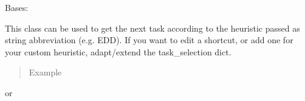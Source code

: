 \documentclass[letterpaper,10pt,english]{sphinxmanual}
\begin{document}
\begin{fulllineitems}
\label{\detokenize{agents.heuristic:agents.heuristic.heuristic_agent.HeuristicSelectionAgent}}
\sphinxAtStartPar
Bases: 

\sphinxAtStartPar
This class can be used to get the next task according to the heuristic passed as string abbreviation (e.g. EDD).
If you want to edit a shortcut, or add one for your custom heuristic, adapt/extend the task\_selection dict.
\begin{quote}\begin{description}
\item[{Example}] \leavevmode
\end{description}\end{quote}

\begin{sphinxVerbatim}[commandchars=\\\{\}]
 
     
\end{sphinxVerbatim}

\sphinxAtStartPar
or

\begin{sphinxVerbatim}[commandchars=\\\{\}]
  
     
     
\end{sphinxVerbatim}

\begin{fulllineitems}
\label{\detokenize{agents.heuristic:agents.heuristic.heuristic_agent.HeuristicSelectionAgent.__init__}}
\end{fulllineitems}


\end{fulllineitems}
\end{document}
